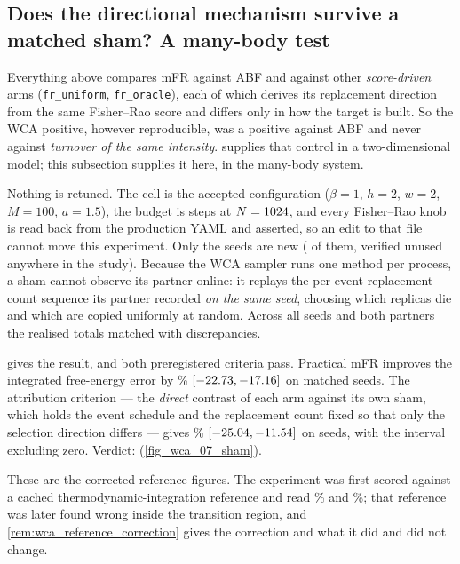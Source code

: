 \subsection{Does the directional mechanism survive a matched sham? A many-body test}
\label{sec:wca_sham}
Everything above compares mFR against ABF and against other \emph{score-driven} arms
(\texttt{fr\_uniform}, \texttt{fr\_oracle}), each of which derives its replacement direction
from the same Fisher--Rao score and differs only in how the target is built. So the WCA
positive, however reproducible, was a positive against ABF and never against \emph{turnover of
the same intensity}.  supplies that control in a two-dimensional model; this
subsection supplies it here, in the many-body system.

Nothing is retuned. The cell is the accepted \WcsCell{} configuration
($\beta=1$, $h=2$, $w=2$, $M=100$, $a=1.5$), the budget is \WcsSteps{} steps at
$N=1024$, and every Fisher--Rao knob is read back from the production YAML and
asserted, so an edit to that file cannot move this experiment. Only the seeds are new
(\WcsSeeds{} of them, verified unused anywhere in the study). Because the WCA sampler runs one
method per process, a sham cannot observe its partner online: it replays the per-event
replacement count sequence its partner recorded \emph{on the same seed}, choosing which
replicas die and which are copied uniformly at random. Across all seeds and both partners the
realised totals matched with \WcsMismatch{} discrepancies.



 gives the result, and both preregistered criteria pass. Practical mFR
improves the integrated free-energy error by \WcvEstGain\% $[-22.73, -17.16]$ on
\WcvEstWins{} matched seeds. The attribution criterion --- the \emph{direct} contrast of each
arm against its own sham, which holds the event schedule and the replacement count fixed so
that only the selection direction differs --- gives \WcvDirect\%
$[-25.04, -11.54]$ on \WcvDirectWins{} seeds, with the interval excluding zero.
Verdict: \textbf{\WcsVerdict} (\cref{fig_wca_07_sham}).

These are the corrected-reference figures. The experiment was first scored against a cached
thermodynamic-integration reference and read \WcsEstGain\% and \WcsDirect\%; that reference
was later found wrong inside the transition region, and \cref{rem:wca_reference_correction}
gives the correction and what it did and did not change.

